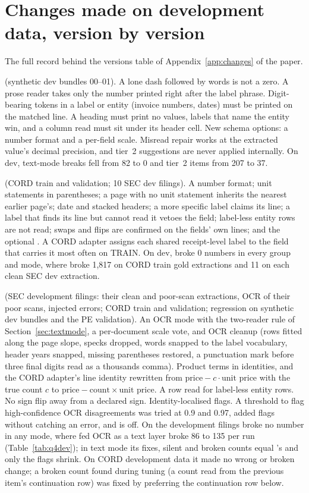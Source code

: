 \section{Changes made on development data, version by version}\label{sup:changes}
The full record behind the versions table of Appendix~\ref{app:changes} of the paper.

\textbf{} (synthetic dev bundles 00--01). A lone dash followed by words is not a zero. A prose reader takes only the number printed right after the label phrase. Digit-bearing tokens in a label or entity (invoice numbers, dates) must be printed on the matched line. A heading must print no values, labels that name the entity win, and a column read must sit under its header cell. New schema options: a  number format and a per-field scale. Misread repair works at the extracted value's decimal precision, and tier~2 suggestions are never applied internally. On dev, text-mode breaks fell from 82 to 0 and tier~2 items from 207 to 37.

\textbf{} (CORD train and validation; 10 SEC dev filings). A  number format; unit statements in parentheses; a page with no unit statement inherits the nearest earlier page's; date and stacked headers; a more specific label claims its line; a label that finds its line but cannot read it vetoes the field; label-less entity rows are not read; swaps and flips are confirmed on the fields' own lines; and the optional . A CORD adapter assigns each shared receipt-level label to the field that carries it most often on TRAIN. On dev,  broke 0 numbers in every group and mode, where  broke 1,817 on CORD train gold extractions and 11 on each clean SEC dev extraction.

\textbf{} (SEC development filings: their clean and poor-scan extractions, OCR of their poor scans, injected errors; CORD train and validation; regression on synthetic dev bundles and the PE validation). An OCR mode with the two-reader rule of Section~\ref{sec:textmode}, a per-document scale vote, and OCR cleanup (rows fitted along the page slope, specks dropped, words snapped to the label vocabulary, header years snapped, missing parentheses restored, a punctuation mark before three final digits read as a thousands comma). Product terms in identities, and the CORD adapter's line identity rewritten from $\text{price}-c\cdot\text{unit price}$ with the true count $c$ to $\text{price}-\text{count}\times\text{unit price}$. A row read for label-less entity rows. No sign flip away from a declared sign. Identity-localised flags. A threshold to flag high-confidence OCR disagreements was tried at 0.9 and 0.97, added flags without catching an error, and is off. On the development filings  broke no number in any mode, where  fed OCR as a text layer broke 86 to 135 per run (Table~\ref{tab:q4dev}); in text mode its fixes, silent and broken counts equal 's and only the flags shrink. On CORD development data it made no wrong or broken change; a broken count found during tuning (a count read from the previous item's continuation row) was fixed by preferring the continuation row below.

